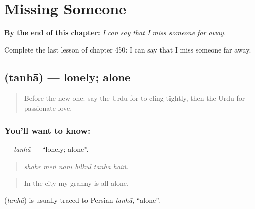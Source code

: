 
\chapter{Missing Someone}
\label{ch:ur-missing-someone}

\begin{chapteropening}
\textbf{By the end of this chapter:} \emph{I can say that I miss someone far away.}

Complete the last lesson of chapter 450: I can say that I miss someone far away.
\end{chapteropening}

\section[\texorpdfstring{\ur{تنہا} (tanhā)}{تنہا (tanhā)}]{ (tanhā) — lonely; alone}

\label{lesson:UR-C450-tanha}



\begin{quote}
Before the new one: say the Urdu for to cling tightly, then the Urdu for passionate love.
\end{quote}

\subsection*{You'll want to know: }
\textbf{} — \emph{tanhā} — \textquotedblleft{}lonely; alone\textquotedblright{}.

\begin{quote}
     
\end{quote}

\begin{quote}
\emph{shahr meṅ nānī bilkul tanhā haiṅ.}
\end{quote}

\begin{quote}
In the city my granny is all alone.
\end{quote}

\begin{cousinweb}
\textbf{} (\emph{tanhā}) is usually traced to Persian \emph{tanhā}, \textquotedblleft{}alone\textquotedblright{}.
\end{cousinweb}

